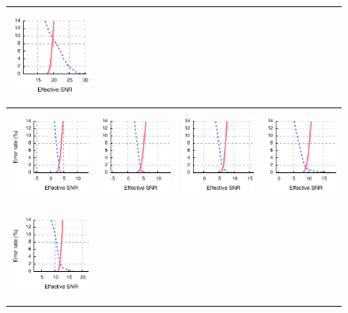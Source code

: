 \begin{figure}[p]
\begin{xtrafullpage}
\begin{tabular}{cccc}
	\includegraphics[height=1.2in]{figures/delivery/goodbad/esnr_goodbad_15.pdf} \\

	\midrule
	\includegraphics[height=1.2in]{figures/delivery/goodbad/esnr_goodbad_16.pdf} &
	\includegraphics[height=1.2in]{figures/delivery/goodbad/esnr_goodbad_17.pdf} &
	\includegraphics[height=1.2in]{figures/delivery/goodbad/esnr_goodbad_18.pdf} &
	\includegraphics[height=1.2in]{figures/delivery/goodbad/esnr_goodbad_19.pdf} \\
	\includegraphics[height=1.2in]{figures/delivery/goodbad/esnr_goodbad_20.pdf} &

\end{tabular}
\end{xtrafullpage}
\end{figure}
